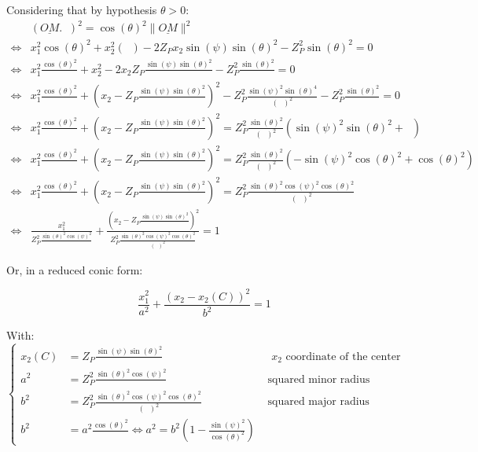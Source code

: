 \documentclass[a4paper,11pt,twoside,titlepage,openright]{book}
\numberwithin{equation}{section}
\newcommand{\lt}{\left}
\newcommand{\rt}{\right}
\DeclareMathOperator{\ez}{\underline{e}_z}
\DeclareMathOperator{\DD}{\cos(\theta)^2 - \sin(\psi)^2}
\begin{document}
Considering that by hypothesis $\theta>0$:
$$
\begin{array}{lll}
	& (\underline{OM}.\ez)^2 = \cos(\theta)^2 \|\underline{OM}\|^2\\
	\Leftrightarrow & x_1^2\cos(\theta)^2 + x_2^2\lt(\DD\rt) - 2Z_Px_2\sin(\psi)\sin(\theta)^2 - Z_P^2\sin(\theta)^2 = 0\\
	\Leftrightarrow & x_1^2\frac{\cos(\theta)^2}{\DD} + x_2^2 - 2x_2Z_P\frac{\sin(\psi)\sin(\theta)^2}{\DD} - Z_P^2\frac{\sin(\theta)^2}{\DD} = 0\\
	\Leftrightarrow & x_1^2\frac{\cos(\theta)^2}{\DD} + \lt(x_2 - Z_P\frac{\sin(\psi)\sin(\theta)^2}{\DD}\rt)^2 - Z_P^2\frac{\sin(\psi)^2\sin(\theta)^4}{\lt(\DD\rt)^2} - Z_P^2\frac{\sin(\theta)^2}{\DD} = 0\\
	\Leftrightarrow & x_1^2\frac{\cos(\theta)^2}{\DD} + \lt(x_2 - Z_P\frac{\sin(\psi)\sin(\theta)^2}{\DD}\rt)^2 = Z_P^2 \frac{\sin(\theta)^2}{\lt(\DD\rt)^2} \lt(\sin(\psi)^2\sin(\theta)^2 + \DD \rt)\\
	\Leftrightarrow & x_1^2\frac{\cos(\theta)^2}{\DD} + \lt(x_2 - Z_P\frac{\sin(\psi)\sin(\theta)^2}{\DD}\rt)^2 = Z_P^2 \frac{\sin(\theta)^2}{\lt(\DD\rt)^2} \lt(-\sin(\psi)^2\cos(\theta)^2 + \cos(\theta)^2 \rt)\\
	\Leftrightarrow & x_1^2\frac{\cos(\theta)^2}{\DD} + \lt(x_2 - Z_P\frac{\sin(\psi)\sin(\theta)^2}{\DD}\rt)^2 = Z_P^2 \frac{\sin(\theta)^2\cos(\psi)^2\cos(\theta)^2}{\lt(\DD\rt)^2} \\
	\Leftrightarrow & \frac{x_1^2}{ Z_P^2\frac{\sin(\theta)^2\cos(\psi)^2}{\DD} } + \frac{\lt(x_2-Z_P\frac{\sin(\psi)\sin(\theta)^2}{\DD}\rt)^2}{ Z_P^2\frac{\sin(\theta)^2\cos(\psi)^2\cos(\theta)^2}{\lt(\DD\rt)^2} } = 1
\end{array}
$$

Or, in a reduced conic form:

$$
\frac{x_1^2}{ a^2 } + \frac{\lt(x_2-x_2(C)\rt)^2}{b^2} = 1
$$


With:
$$
\lt\{
	\begin{array}{lll}
		x_2(C) & = Z_P\frac{\sin(\psi)\sin(\theta)^2}{\DD} & \text{    $x_2$ coordinate of the center} \\
		a^2 & = Z_P^2\frac{\sin(\theta)^2\cos(\psi)^2}{\DD} & \text{    squared minor radius} \\
		b^2 & = Z_P^2\frac{\sin(\theta)^2\cos(\psi)^2\cos(\theta)^2}{\lt(\DD\rt)^2} & \text{    squared major radius} \\
		b^2 & = a^2\frac{\cos(\theta)^2}{\DD} \Leftrightarrow a^2 = b^2\lt(1-\frac{\sin(\psi)^2}{\cos(\theta)^2}\rt)
	\end{array}
\rt.
$$
\end{document}
